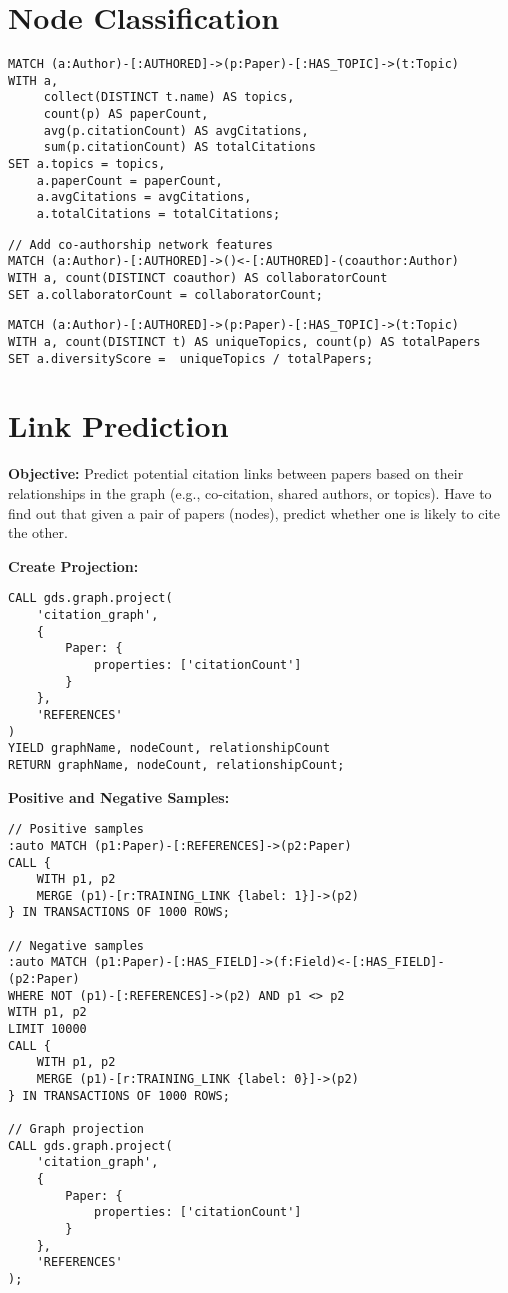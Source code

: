 \documentclass{article}
\theoremstyle{mytheoremstyle}
\theoremstyle{mytheoremstyle}
\theoremstyle{myproblemstyle}
\begin{document}
\section{Node Classification}
\begin{lstlisting}
MATCH (a:Author)-[:AUTHORED]->(p:Paper)-[:HAS_TOPIC]->(t:Topic)
WITH a, 
     collect(DISTINCT t.name) AS topics,
     count(p) AS paperCount,
     avg(p.citationCount) AS avgCitations,
     sum(p.citationCount) AS totalCitations
SET a.topics = topics,
    a.paperCount = paperCount,
    a.avgCitations = avgCitations,
    a.totalCitations = totalCitations;
\end{lstlisting}

\begin{lstlisting}
// Add co-authorship network features
MATCH (a:Author)-[:AUTHORED]->()<-[:AUTHORED]-(coauthor:Author)
WITH a, count(DISTINCT coauthor) AS collaboratorCount
SET a.collaboratorCount = collaboratorCount;
\end{lstlisting}

\begin{lstlisting}
MATCH (a:Author)-[:AUTHORED]->(p:Paper)-[:HAS_TOPIC]->(t:Topic)
WITH a, count(DISTINCT t) AS uniqueTopics, count(p) AS totalPapers
SET a.diversityScore =  uniqueTopics / totalPapers;
\end{lstlisting}


\section{Link Prediction}
\textbf{Objective:} Predict potential citation links between papers based on their relationships in the graph (e.g., co-citation, shared authors, or topics). Have to find out that given a pair of papers (nodes), predict whether one is likely to cite the other.

\textbf{Create Projection:}
\begin{lstlisting}
CALL gds.graph.project(
    'citation_graph',
    {
        Paper: {
            properties: ['citationCount']
        }
    },
    'REFERENCES'
)
YIELD graphName, nodeCount, relationshipCount
RETURN graphName, nodeCount, relationshipCount;
\end{lstlisting}

\textbf{Positive and Negative Samples:}
\begin{lstlisting}
// Positive samples
:auto MATCH (p1:Paper)-[:REFERENCES]->(p2:Paper)
CALL {
    WITH p1, p2
    MERGE (p1)-[r:TRAINING_LINK {label: 1}]->(p2)
} IN TRANSACTIONS OF 1000 ROWS;

// Negative samples
:auto MATCH (p1:Paper)-[:HAS_FIELD]->(f:Field)<-[:HAS_FIELD]-(p2:Paper)
WHERE NOT (p1)-[:REFERENCES]->(p2) AND p1 <> p2
WITH p1, p2
LIMIT 10000
CALL {
    WITH p1, p2
    MERGE (p1)-[r:TRAINING_LINK {label: 0}]->(p2)
} IN TRANSACTIONS OF 1000 ROWS;

// Graph projection
CALL gds.graph.project(
    'citation_graph',
    {
        Paper: {
            properties: ['citationCount']
        }
    },
    'REFERENCES'
);
\end{lstlisting}
\end{document}
